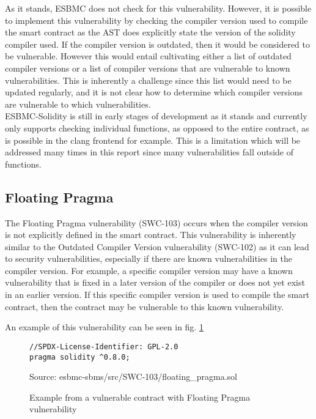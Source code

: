 As it stands, ESBMC does not check for this vulnerability. However, it is possible to implement this vulnerability by checking the compiler version used to compile the smart contract as the AST does explicitly state the version of the solidity compiler used. If the compiler version is outdated, then it would be considered to be vulnerable. However this would entail cultivating either a list of outdated compiler versions or a list of compiler versions that are vulnerable to known vulnerabilities. This is inherently a challenge since this list would need to be updated regularly, and it is not clear how to determine which compiler versions are vulnerable to which vulnerabilities.\\
ESBMC-Solidity is still in early stages of development as it stands and currently only supports checking individual functions, as opposed to the entire contract, as is possible in the clang frontend for example. This is a limitation which will be addressed many times in this report since many vulnerabilities fall outside of functions. 

\subsection{Floating Pragma}
\label{sec:floating_pragma}

The Floating Pragma vulnerability (SWC-103) occurs when the compiler version is not explicitly defined in the smart contract. This vulnerability is inherently similar to the Outdated Compiler Version vulnerability (SWC-102) as it can lead to security vulnerabilities, especially if there are known vulnerabilities in the compiler version. For example, a specific compiler version may have a known vulnerability that is fixed in a later version of the compiler or does not yet exist in an earlier version. If this specific compiler version is used to compile the smart contract, then the contract may be vulnerable to this known vulnerability.

An example of this vulnerability can be seen in fig. \ref{fig:floating_pragma}

\begin{figure}
\begin{lstlisting}
//SPDX-License-Identifier: GPL-2.0
pragma solidity ^0.8.0;
\end{lstlisting}
\caption{Example from a vulnerable contract with Floating Pragma vulnerability }
Source: esbmc-sbms/src/SWC-103/floating\_pragma.sol
\label{fig:floating_pragma}
\end{figure}

